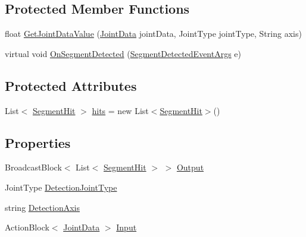\subsection*{Protected Member Functions}
\begin{DoxyCompactItemize}
\item 
float \hyperlink{class_rowing_monitor_1_1_model_1_1_pipeline_1_1_segment_detector_a1f8ffebdfca18aa67a213ca817981161}{Get\+Joint\+Data\+Value} (\hyperlink{struct_rowing_monitor_1_1_model_1_1_util_1_1_joint_data}{Joint\+Data} joint\+Data, Joint\+Type joint\+Type, String axis)
\item 
virtual void \hyperlink{class_rowing_monitor_1_1_model_1_1_pipeline_1_1_segment_detector_a30d5b8752257a3992db11770506f6a8a}{On\+Segment\+Detected} (\hyperlink{class_rowing_monitor_1_1_model_1_1_segment_detected_event_args}{Segment\+Detected\+Event\+Args} e)
\end{DoxyCompactItemize}
\subsection*{Protected Attributes}
\begin{DoxyCompactItemize}
\item 
List$<$ \hyperlink{struct_rowing_monitor_1_1_model_1_1_util_1_1_segment_hit}{Segment\+Hit} $>$ \hyperlink{class_rowing_monitor_1_1_model_1_1_pipeline_1_1_segment_detector_a567492ea6e393bed7c946359cdf7c866}{hits} = new List$<$\hyperlink{struct_rowing_monitor_1_1_model_1_1_util_1_1_segment_hit}{Segment\+Hit}$>$()
\end{DoxyCompactItemize}
\subsection*{Properties}
\begin{DoxyCompactItemize}
\item 
Broadcast\+Block$<$ List$<$ \hyperlink{struct_rowing_monitor_1_1_model_1_1_util_1_1_segment_hit}{Segment\+Hit} $>$ $>$ \hyperlink{class_rowing_monitor_1_1_model_1_1_pipeline_1_1_segment_detector_a2f9933aa3e7251629d0b1676b73a336a}{Output}
\item 
Joint\+Type \hyperlink{class_rowing_monitor_1_1_model_1_1_pipeline_1_1_segment_detector_a0bc85068e6ac401713535e38c0f1e18d}{Detection\+Joint\+Type}
\item 
string \hyperlink{class_rowing_monitor_1_1_model_1_1_pipeline_1_1_segment_detector_ae8b2b75b70356efbe159de7427eb31fd}{Detection\+Axis}
\item 
Action\+Block$<$ \hyperlink{struct_rowing_monitor_1_1_model_1_1_util_1_1_joint_data}{Joint\+Data} $>$ \hyperlink{class_rowing_monitor_1_1_model_1_1_pipeline_1_1_segment_detector_a1dff97a3144d7642595a8ce1fd4831a4}{Input}
\end{DoxyCompactItemize}
